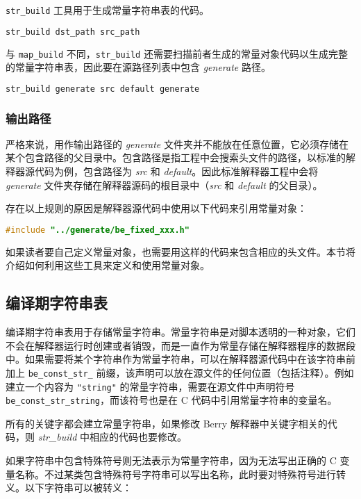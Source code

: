 \texttt{str\_build} 工具用于生成常量字符串表的代码。
\begin{lstlisting}[language=bash, numbers=none]
str_build dst_path src_path
\end{lstlisting}
与 \texttt{map\_build} 不同，\texttt{str\_build} 还需要扫描前者生成的常量对象代码以生成完整的常量字符串表，因此要在源路径列表中包含 \textsl{generate} 路径。
\begin{lstlisting}[language=bash, numbers=none]
str_build generate src default generate
\end{lstlisting}

\subsubsection{输出路径}

严格来说，用作输出路径的 \textsl{generate} 文件夹并不能放在任意位置，它必须存储在某个包含路径的父目录中。包含路径是指工程中会搜索头文件的路径，以标准的解释器源代码为例，包含路径为 \textsl{src} 和 \textsl{default}。因此标准解释器工程中会将 \textsl{generate} 文件夹存储在解释器源码的根目录中（\textsl{src} 和 \textsl{default} 的父目录）。

存在以上规则的原因是解释器源代码中使用以下代码来引用常量对象：
\begin{lstlisting}[language=c, numbers=none]
#include "../generate/be_fixed_xxx.h"
\end{lstlisting}

如果读者要自己定义常量对象，也需要用这样的代码来包含相应的头文件。本节将介绍如何利用这些工具来定义和使用常量对象。

\subsection{编译期字符串表}

编译期字符串表用于存储常量字符串。常量字符串是对脚本透明的一种对象，它们不会在解释器运行时创建或者销毁，而是一直作为常量存储在解释器程序的数据段中。如果需要将某个字符串作为常量字符串，可以在解释器源代码中在该字符串前加上 \texttt{be\_const\_str\_} 前缀，该声明可以放在源文件的任何位置（包括注释）。例如建立一个内容为 \texttt{"string"} 的常量字符串，需要在源文件中声明符号 \texttt{be\_const\_str\_string}，而该符号也是在 C 代码中引用常量字符串的变量名。

所有的关键字都会建立常量字符串，如果修改 Berry 解释器中关键字相关的代码，则 \textsl{str\_build} 中相应的代码也要修改。

如果字符串中包含特殊符号则无法表示为常量字符串，因为无法写出正确的 C 变量名称。不过某类包含特殊符号字符串可以写出名称，此时要对特殊符号进行转义。以下字符串可以被转义：

